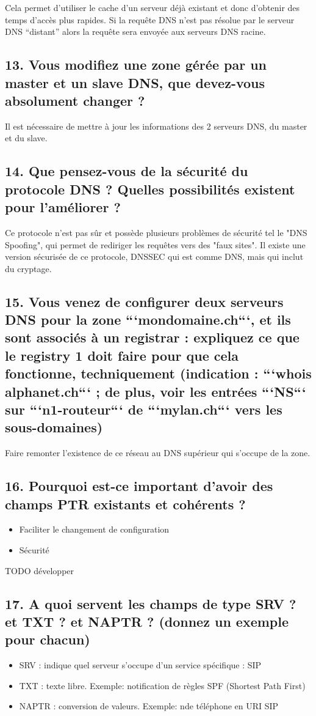 \documentclass{article}
\begin{document}
Cela permet d'utiliser le cache d'un serveur déjà existant et donc d'obtenir des temps d'accès plus rapides. Si la requête DNS n'est pas résolue par le serveur DNS “distant” alors la requête sera envoyée aux serveurs DNS racine.

\subsection*{13. Vous modifiez une zone gérée par un master et un slave DNS, que devez-vous absolument changer ?}
Il est nécessaire de mettre à jour les informations des 2 serveurs DNS, du master et du slave.

\subsection*{14. Que pensez-vous de la sécurité du protocole DNS ? Quelles possibilités existent pour l’améliorer ?}
Ce protocole n'est pas sûr et possède plusieurs problèmes de sécurité tel le "DNS Spoofing", qui permet de rediriger les requêtes vers des "faux sites". Il existe une version sécurisée de ce protocole, DNSSEC qui est comme DNS, mais qui inclut du cryptage.

\subsection*{15. Vous venez de configurer deux serveurs DNS pour la zone ```mondomaine.ch```, et ils sont associés à un registrar : expliquez ce que le registry 1 doit faire pour que cela fonctionne, techniquement (indication : ```whois alphanet.ch``` ; de plus, voir les entrées ```NS``` sur ```n1-routeur``` de ```mylan.ch``` vers les sous-domaines)}
Faire remonter l'existence de ce réseau au DNS supérieur qui s'occupe de la zone.

\subsection*{16. Pourquoi est-ce important d’avoir des champs PTR existants et cohérents ?}
\begin{itemize}
\item Faciliter le changement de configuration
\item Sécurité
\end{itemize}
TODO développer

\subsection*{17. A quoi servent les champs de type SRV ? et TXT ? et NAPTR ? (donnez un exemple pour chacun)}
\begin{itemize}
\item SRV : indique quel serveur s'occupe d'un service spécifique : SIP
\item TXT : texte libre. Exemple: notification de règles SPF (Shortest Path First)
\item NAPTR : conversion de valeurs. Exemple: n\degre de téléphone en URI SIP
\end{itemize}
\end{document}
